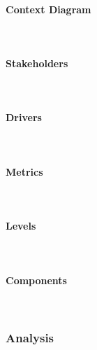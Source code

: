 \paragraph{Context Diagram}\mbox{}\\
\paragraph{Stakeholders}\mbox{}\\
\paragraph{Drivers}\mbox{}\\
\paragraph{Metrics}\mbox{}\\
\paragraph{Levels}\mbox{}\\
\paragraph{Components}\mbox{}\\

\subsubsection{Analysis}
